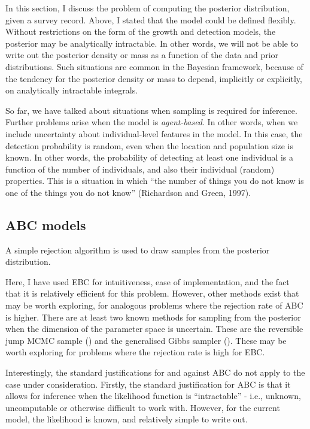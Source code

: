 \documentclass[
]{book}
\begin{document}
In this section, I discuss the problem of computing the posterior distribution, given a survey record. Above, I stated that the model could be defined flexibly. Without restrictions on the form of the growth and detection models, the posterior may be analytically intractable. In other words, we will not be able to write out the posterior density or mass as a function of the data and prior distributions. Such situations are common in the Bayesian framework, because of the tendency for the posterior density or mass to depend, implicitly or explicitly, on analytically intractable integrals.

So far, we have talked about situations when sampling is required for inference. Further problems arise when the model is \emph{agent-based}. In other words, when we include uncertainty about individual-level features in the model. In this case, the detection probability is random, even when the location and population size is known. In other words, the probability of detecting at least one individual is a function of the number of individuals, and also their individual (random) properties. This is a situation in which ``the number of things you do not know is one of the things you do not know'' (Richardson and Green, 1997).

\hypertarget{abc-models}{%
\subsection{ABC models}\label{abc-models}}

A simple rejection algorithm is used to draw samples from the posterior distribution.

Here, I have used EBC for intuitiveness, ease of implementation, and the fact that it is relatively efficient for this problem. However, other methods exist that may be worth exploring, for analogous problems where the rejection rate of ABC is higher. There are at least two known methods for sampling from the posterior when the dimension of the parameter space is uncertain. These are the reversible jump MCMC sample (\citet{green1995}) and the generalised Gibbs sampler (\citet{keith2015}). These may be worth exploring for problems where the rejection rate is high for EBC.

Interestingly, the standard justifications for and against ABC do not apply to the case under consideration. Firstly, the standard justification for ABC is that it allows for inference when the likelihood function is ``intractable'' - i.e., unknown, uncomputable or otherwise difficult to work with. However, for the current model, the likelihood is known, and relatively simple to write out.
\end{document}
